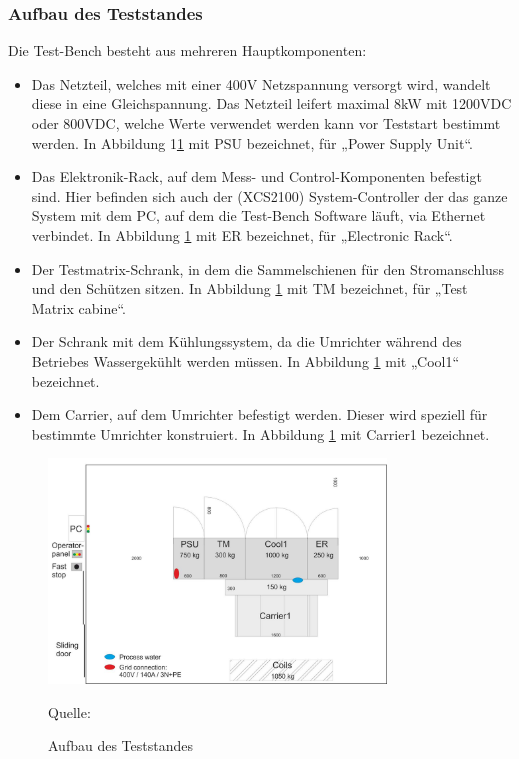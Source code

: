\subsubsection{Aufbau des Teststandes}
Die Test-Bench besteht aus mehreren Hauptkomponenten:
\begin{itemize}
\item Das Netzteil, welches mit einer 400V Netzspannung versorgt wird, wandelt diese in eine Gleichspannung. Das Netzteil leifert maximal 8kW mit 1200VDC oder 800VDC, welche Werte verwendet werden kann vor Teststart bestimmt werden. In Abbildung 1\ref{fig:1. Aufbau des Teststandes} mit PSU bezeichnet, für „Power Supply Unit“.
\item Das Elektronik-Rack, auf dem Mess- und Control-Komponenten befestigt sind. Hier befinden sich auch der (XCS2100) System-Controller der das ganze System mit dem PC, auf dem die Test-Bench Software läuft, via Ethernet verbindet. In Abbildung \ref{fig:1. Aufbau des Teststandes} mit ER bezeichnet, für „Electronic Rack“.
\item Der Testmatrix-Schrank, in dem die Sammelschienen für den Stromanschluss und den Schützen sitzen. In Abbildung \ref{fig:1. Aufbau des Teststandes} mit TM bezeichnet, für „Test Matrix cabine“.
\item Der Schrank mit dem Kühlungssystem, da die Umrichter während des Betriebes Wassergekühlt werden müssen. In Abbildung \ref{fig:1. Aufbau des Teststandes} mit „Cool1“ bezeichnet.
\item Dem Carrier, auf dem Umrichter befestigt werden. Dieser wird speziell für bestimmte Umrichter konstruiert. In Abbildung \ref{fig:1. Aufbau des Teststandes} mit Carrier1 bezeichnet.

\end{itemize}


\begin{figure}[h]
    \centering
    \includegraphics[width=0.8\textwidth]{Grafiken/Test Cabin.jpg}
    \caption{Aufbau des Teststandes}
    \label{fig:1. Aufbau des Teststandes}
    {Quelle: \cite*[7]{Main_Manuel_USTB2018}}
\end{figure}



